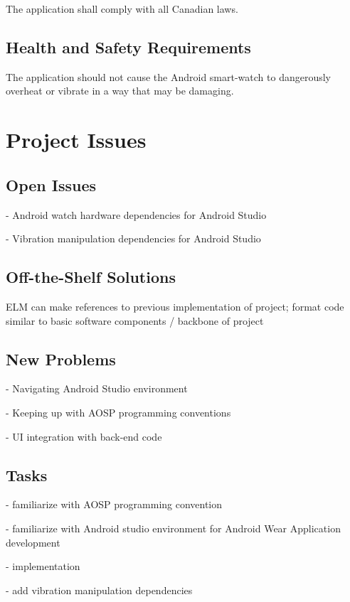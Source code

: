 \documentclass[12pt, titlepage]{article}
\begin{document}
The application shall comply with all Canadian laws.

\subsection{Health and Safety Requirements}

The application should not cause the Android smart-watch to dangerously overheat or vibrate in a way that may be damaging. %

\section{Project Issues}
\subsection{Open Issues}

- Android watch hardware dependencies for Android Studio

\noindent - Vibration manipulation dependencies for Android Studio

\subsection{Off-the-Shelf Solutions}

ELM can make references to previous implementation of project; format code similar to basic software components / backbone of project


\subsection{New Problems}

- Navigating Android Studio environment

\noindent - Keeping up with AOSP programming conventions

\noindent - UI integration with back-end code

\subsection{Tasks}

- familiarize with AOSP programming convention

\noindent - familiarize with Android studio environment for Android Wear Application development

\noindent - implementation

- add vibration manipulation dependencies
\end{document}
